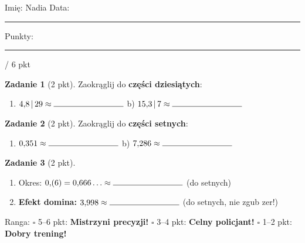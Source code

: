 \documentclass[11pt,a4paper]{article}
\begin{document}

\vspace{0.2em}
Imię: Nadia \hfill Data: \rule{3cm}{0.4pt} \hfill Punkty: \rule{1.2cm}{0.4pt} / 6 pkt

\vspace{0.6em}
\textbf{Zadanie 1} (2 pkt). Zaokrąglij do \textbf{części dziesiątych}:
\begin{enumerate}[label=\alph*), leftmargin=*, itemsep=6pt]
  \item $4{,}8\,|\,29\approx\rule{3cm}{0.4pt}$ \hspace{1cm} b) $15{,}3\,|\,7\approx\rule{3cm}{0.4pt}$
\end{enumerate}

\textbf{Zadanie 2} (2 pkt). Zaokrąglij do \textbf{części setnych}:
\begin{enumerate}[label=\alph*), leftmargin=*, itemsep=6pt]
  \item $0{,}351\approx\rule{3cm}{0.4pt}$ \hspace{1cm} b) $7{,}286\approx\rule{3cm}{0.4pt}$
\end{enumerate}

\textbf{Zadanie 3} (2 pkt).
\begin{enumerate}[label=\alph*), leftmargin=*, itemsep=6pt]
  \item Okres: $0{,}(6)=0{,}666\ldots\approx\rule{3cm}{0.4pt}$ (do setnych)
  \item \textbf{Efekt domina:} $3{,}998\approx\rule{3cm}{0.4pt}$ (do setnych, nie zgub zer!)
\end{enumerate}

\vspace{0.6em}
\begin{tcolorbox}[colback=white, colframe=cel, boxrule=0.6pt, arc=2pt]
Ranga: \quad $\square$ 5--6 pkt: \textbf{Mistrzyni precyzji!} \quad $\square$ 3--4 pkt: \textbf{Celny policjant!} \quad $\square$ 1--2 pkt: \textbf{Dobry trening!}
\end{tcolorbox}
\end{document}
